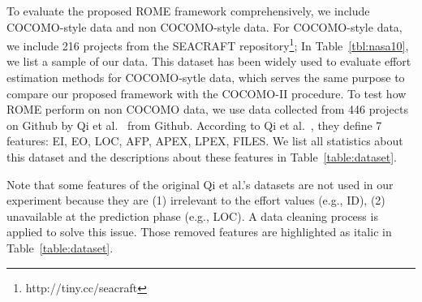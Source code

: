 \documentclass[sigconf,review]{acmart}
\newcommand{\tbl}[1]{Table~\ref{tbl:#1}}
\begin{document}
To evaluate the proposed ROME framework comprehensively, we include COCOMO-style data and non COCOMO-style data. For COCOMO-style data, we include 216 projects from the SEACRAFT repository\footnote{http://tiny.cc/seacraft}; In \tbl{nasa10}, we list a sample of our data. This dataset has been widely used to evaluate effort estimation methods for COCOMO-sytle data, which serves the same purpose to compare our proposed framework with the COCOMO-II procedure. 
To test how ROME perform on non COCOMO data, we use data  collected from  446 projects on Github by Qi et al.~\cite{qi2017software} from Github. 
According to Qi et al.~\cite{qi2017software}, they define 7 features: EI, EO, LOC, AFP, APEX, LPEX, FILES. We list all statistics about this dataset and the descriptions about these features in Table~\ref{table:dataset}. 

Note that some features of the original Qi et al.'s datasets are not used in our experiment because they are (1) irrelevant to the effort values (e.g., ID), (2) unavailable at the prediction phase (e.g., LOC). A data cleaning process is applied to solve this issue. 
Those removed features are highlighted as italic in Table~\ref{table:dataset}.
\end{document}

